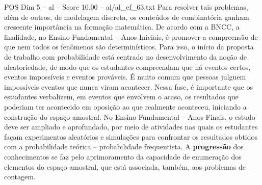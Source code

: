 \begin{textsample}{POS Dim 5 – al – Score 10.00 – al/al\_ef\_63.txt}
Para resolver tais problemas, além de outros, de modelagem discreta, os conteúdos de combinatória ganham crescente importância na formação matemática.
De acordo com a BNCC, a finalidade, no Ensino Fundamental – Anos Iniciais, é promover a compreensão de que nem todos os fenômenos são determinísticos.
Para isso, o início da proposta de trabalho com probabilidade está centrado no desenvolvimento da noção de aleatoriedade, de modo que os estudantes compreendam que há eventos certos, eventos impossíveis e eventos prováveis.
É muito comum que pessoas julguem impossíveis eventos que nunca viram acontecer.
Nessa fase, é importante que os estudantes verbalizem, em eventos que envolvem o acaso, os resultados que poderiam ter acontecido em oposição ao que realmente aconteceu, iniciando a construção do espaço amostral.
No Ensino Fundamental – Anos Finais, o estudo deve ser ampliado e aprofundado, por meio de atividades nas quais os estudantes façam experimentos aleatórios e simulações para confrontar os resultados obtidos com a probabilidade teórica – probabilidade frequentista.
A \textbf{progressão} dos conhecimentos se faz pelo aprimoramento da capacidade de enumeração dos elementos do espaço amostral, que está associada, também, aos problemas de contagem.

\end{textsample}
